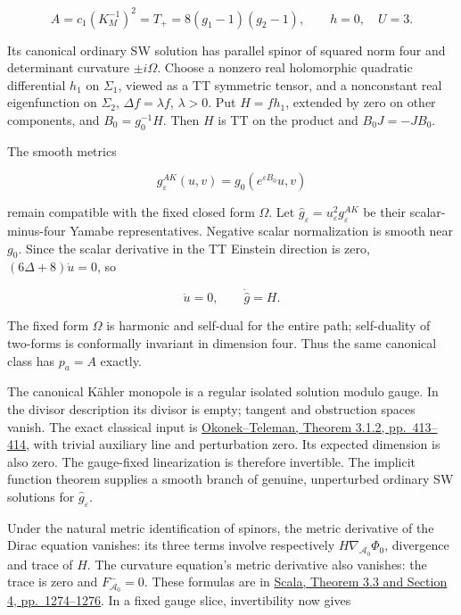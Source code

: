\documentclass[
  10pt,
]{article}
\begin{document}
\[
 A=c_1(K_M^{-1})^2=T_+=8(g_1-1)(g_2-1),\qquad h=0,\quad U=3.
\]

Its canonical ordinary SW solution has parallel spinor of squared norm
four and determinant curvature \(\pm i\Omega\). Choose a nonzero real
holomorphic quadratic differential \(h_1\) on \(\Sigma_1\), viewed as a
TT symmetric tensor, and a nonconstant real eigenfunction on
\(\Sigma_2\), \(\Delta f=\lambda f\), \(\lambda>0\). Put \(H=f h_1\),
extended by zero on other components, and \(B_0=g_0^{-1}H\). Then \(H\)
is TT on the product and \(B_0J=-JB_0\).

The smooth metrics

\[
 g_\varepsilon^{AK}(u,v)=g_0(e^{\varepsilon B_0}u,v)
\]

remain compatible with the fixed closed form \(\Omega\). Let
\(\widehat g_\varepsilon=u_\varepsilon^2g_\varepsilon^{AK}\) be their
scalar-minus-four Yamabe representatives. Negative scalar normalization
is smooth near \(g_0\). Since the scalar derivative in the TT Einstein
direction is zero, \((6\Delta+8)\dot u=0\), so

\[
 \dot u=0,\qquad \dot{\widehat g}=H.                \tag{3.2}
\]

The fixed form \(\Omega\) is harmonic and self-dual for the entire path;
self-duality of two-forms is conformally invariant in dimension four.
Thus the same canonical class has \(p_a=A\) exactly.

The canonical Kähler monopole is a regular isolated solution modulo
gauge. In the divisor description its divisor is empty; tangent and
obstruction spaces vanish. The exact classical input is
\href{https://library.slmath.org/books/Book37/files/okonek.pdf}{Okonek--Teleman,
Theorem 3.1.2, pp.~413--414}, with trivial auxiliary line and
perturbation zero. Its expected dimension is also zero. The gauge-fixed
linearization is therefore invertible. The implicit function theorem
supplies a smooth branch of genuine, unperturbed ordinary SW solutions
for \(\widehat g_\varepsilon\).

Under the natural metric identification of spinors, the metric
derivative of the Dirac equation vanishes: its three terms involve
respectively \(H\nabla_{\mathcal A_0}\Phi_0\), divergence and trace of
\(H\). The curvature equation's metric derivative also vanishes: the
trace is zero and \(F_{\mathcal A_0}^-=0\). These formulas are in
\href{https://www.numdam.org/item/10.5802/aif.2640.pdf}{Scala, Theorem
3.3 and Section 4, pp.~1274--1276}. In a fixed gauge slice,
invertibility now gives
\end{document}
